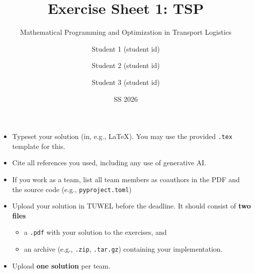 \documentclass[a4paper]{scrartcl}
\title{Exercise Sheet 1: TSP}
\subtitle{Mathematical Programming and Optimization in Transport Logistics}
\author{Student 1 (student id) \and Student 2 (student id) \and Student 3 (student id)}
\date{SS 2026}
\theoremstyle{definition}
\begin{document}
\maketitle

\hrulefill\medskip

\begin{itemize}
	\item Typeset your solution (in, e.g., \LaTeX). You may use the provided \texttt{.tex} template for this.
	\item Cite all references you used, including any use of generative AI.
	\item If you work as a team, list all team members as coauthors in the PDF and the source code (e.g., \texttt{pyproject.toml})
	\item Upload your solution in TUWEL before the deadline. It should consist of \textbf{two files}
		\begin{itemize}
			\item a \texttt{.pdf} with your solution to the exercises, and
			\item an archive (e.g., \texttt{.zip}, \texttt{.tar.gz}) containing your implementation.
		\end{itemize}
	\item Upload \textbf{one solution} per team.
\end{itemize}

\hrulefill\medskip
\end{document}
